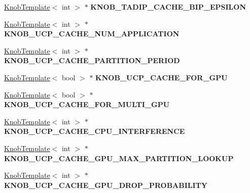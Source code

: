 \begin{DoxyCompactItemize}
\item 
\hypertarget{classall__knobs__c_a7a1ceec2b09cbdf5abb71c583dca06c1}{
\hyperlink{classKnobTemplate}{KnobTemplate}$<$ int $>$ $\ast$ {\bfseries KNOB\_\-TADIP\_\-CACHE\_\-BIP\_\-EPSILON}}
\label{classall__knobs__c_a7a1ceec2b09cbdf5abb71c583dca06c1}

\item 
\hypertarget{classall__knobs__c_a3009ed05586ddf6a20909f96202046b4}{
\hyperlink{classKnobTemplate}{KnobTemplate}$<$ int $>$ $\ast$ {\bfseries KNOB\_\-UCP\_\-CACHE\_\-NUM\_\-APPLICATION}}
\label{classall__knobs__c_a3009ed05586ddf6a20909f96202046b4}

\item 
\hypertarget{classall__knobs__c_a48248ad1429695abd11b6ecfed960fbc}{
\hyperlink{classKnobTemplate}{KnobTemplate}$<$ int $>$ $\ast$ {\bfseries KNOB\_\-UCP\_\-CACHE\_\-PARTITION\_\-PERIOD}}
\label{classall__knobs__c_a48248ad1429695abd11b6ecfed960fbc}

\item 
\hypertarget{classall__knobs__c_a1b8aec9f3ac369d72fab1a5bc0f950f8}{
\hyperlink{classKnobTemplate}{KnobTemplate}$<$ bool $>$ $\ast$ {\bfseries KNOB\_\-UCP\_\-CACHE\_\-FOR\_\-GPU}}
\label{classall__knobs__c_a1b8aec9f3ac369d72fab1a5bc0f950f8}

\item 
\hypertarget{classall__knobs__c_ac1d986b5575d22d63b01821ee750f0e9}{
\hyperlink{classKnobTemplate}{KnobTemplate}$<$ bool $>$ $\ast$ {\bfseries KNOB\_\-UCP\_\-CACHE\_\-FOR\_\-MULTI\_\-GPU}}
\label{classall__knobs__c_ac1d986b5575d22d63b01821ee750f0e9}

\item 
\hypertarget{classall__knobs__c_aa9717e20b7ba80861e1151dd0d6a05ef}{
\hyperlink{classKnobTemplate}{KnobTemplate}$<$ int $>$ $\ast$ {\bfseries KNOB\_\-UCP\_\-CACHE\_\-CPU\_\-INTERFERENCE}}
\label{classall__knobs__c_aa9717e20b7ba80861e1151dd0d6a05ef}

\item 
\hypertarget{classall__knobs__c_a8cf56e310076716138de611cc31f4f03}{
\hyperlink{classKnobTemplate}{KnobTemplate}$<$ int $>$ $\ast$ {\bfseries KNOB\_\-UCP\_\-CACHE\_\-GPU\_\-MAX\_\-PARTITION\_\-LOOKUP}}
\label{classall__knobs__c_a8cf56e310076716138de611cc31f4f03}

\item 
\hypertarget{classall__knobs__c_ac81336474ff2bc4c67f3abc7162f3141}{
\hyperlink{classKnobTemplate}{KnobTemplate}$<$ int $>$ $\ast$ {\bfseries KNOB\_\-UCP\_\-CACHE\_\-GPU\_\-DROP\_\-PROBABILITY}}
\label{classall__knobs__c_ac81336474ff2bc4c67f3abc7162f3141}


\end{DoxyCompactItemize}
